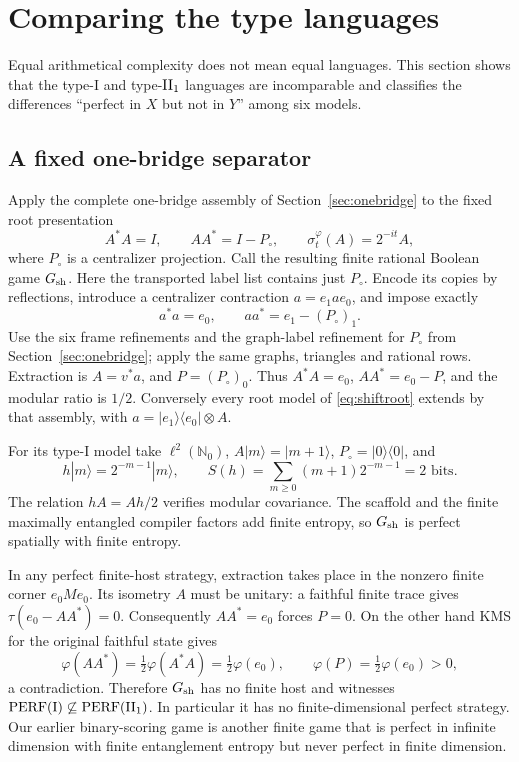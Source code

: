 \section{Comparing the type languages}\label{sec:sep}
Equal arithmetical complexity does not mean equal languages. This section shows that the type-I and type-$\mathrm{II}_1$ languages are incomparable and classifies the differences ``perfect in $X$ but not in $Y$'' among six models.

\subsection{A fixed one-bridge separator}\label{sec:shiftseparator}
Apply the complete one-bridge assembly of Section~\ref{sec:onebridge} to the fixed root presentation
\begin{equation}\label{eq:shiftroot}
 A^*A=I,\qquad AA^*=I-P_\circ,\qquad
 \sigma_t^\varphi(A)=2^{-it}A,
\end{equation}
where $P_\circ$ is a centralizer projection. Call the resulting finite rational Boolean game $G_{\rm sh}$. Here the transported label list contains just $P_\circ$. Encode its copies by reflections, introduce a centralizer contraction $a=e_1ae_0$, and impose exactly
\[
 a^*a=e_0,\qquad aa^*=e_1-(P_\circ)_1.
\]
Use the six frame refinements and the graph-label refinement for $P_\circ$ from Section~\ref{sec:onebridge}; apply the same graphs, triangles and rational rows. Extraction is $A=v^*a$, and $P=(P_\circ)_0$. Thus $A^*A=e_0$, $AA^*=e_0-P$, and the modular ratio is $1/2$. Conversely every root model of \eqref{eq:shiftroot} extends by that assembly, with $a=|e_1\rangle\langle e_0|\otimes A$.

For its type-I model take $\ell^2(\mathbb N_0)$, $A|m\rangle=|m+1\rangle$, $P_\circ=|0\rangle\langle0|$, and
\[
 h|m\rangle=2^{-m-1}|m\rangle,\qquad
 S(h)=\sum_{m\geq0}(m+1)2^{-m-1}=2\text{ bits}.
\]
The relation $hA=Ah/2$ verifies modular covariance. The scaffold and the finite maximally entangled compiler factors add finite entropy, so $G_{\rm sh}$ is perfect spatially with finite entropy.

In any perfect finite-host strategy, extraction takes place in the nonzero finite corner $e_0Me_0$. Its isometry $A$ must be unitary: a faithful finite trace gives $\tau(e_0-AA^*)=0$. Consequently $AA^*=e_0$ forces $P=0$. On the other hand KMS for the original faithful state gives
\[
 \varphi(AA^*)=\tfrac12\varphi(A^*A)=\tfrac12\varphi(e_0),
 \qquad \varphi(P)=\tfrac12\varphi(e_0)>0,
\]
a contradiction. Therefore $G_{\rm sh}$ has no finite host and witnesses $\mathrm{PERF}(\mathrm I)\not\subseteq\mathrm{PERF}(\mathrm{II}_1)$. In particular it has no finite-dimensional perfect strategy. Our earlier binary-scoring game \cite{Gamma} is another finite game that is perfect in infinite dimension with finite entanglement entropy but never perfect in finite dimension.

